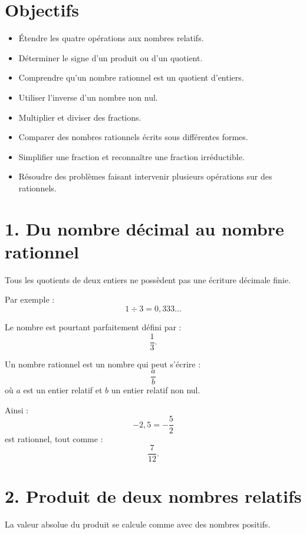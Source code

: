
\section{Objectifs}

\begin{itemize}
\item Étendre les quatre opérations aux nombres relatifs.
\item Déterminer le signe d'un produit ou d'un quotient.
\item Comprendre qu'un nombre rationnel est un quotient d'entiers.
\item Utiliser l'inverse d'un nombre non nul.
\item Multiplier et diviser des fractions.
\item Comparer des nombres rationnels écrits sous différentes formes.
\item Simplifier une fraction et reconnaître une fraction irréductible.
\item Résoudre des problèmes faisant intervenir plusieurs opérations sur des rationnels.
\end{itemize}

\section{1. Du nombre décimal au nombre rationnel}

Tous les quotients de deux entiers ne possèdent pas une écriture décimale finie.

Par exemple :
\[
1\div3=0{,}333\ldots
\]

Le nombre est pourtant parfaitement défini par :
\[
\dfrac13.
\]

\begin{definition}
Un nombre rationnel est un nombre qui peut s'écrire :
\[
\dfrac ab
\]
où $a$ est un entier relatif et $b$ un entier relatif non nul.
\end{definition}

Ainsi :
\[
-2{,}5=-\dfrac52
\]
est rationnel, tout comme :
\[
\dfrac7{12}.
\]

\section{2. Produit de deux nombres relatifs}

La valeur absolue du produit se calcule comme avec des nombres positifs.

